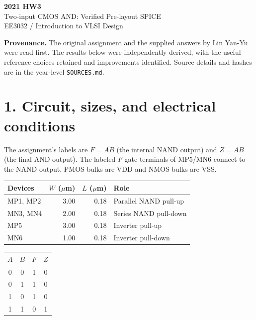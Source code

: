 \documentclass[11pt,a4paper]{article}
\newcommand{\VDD}{V_{\mathrm{DD}}}
\newcommand{\VSS}{V_{\mathrm{SS}}}
\newcommand{\MOS}[5]{
  \coordinate (#1) at (#2,#3);
  \coordinate (#1t) at ($(#1)+(0,.55)$);
  \coordinate (#1b) at ($(#1)+(0,-.55)$);
  \draw (#1t)--($(#1)+(0,.30)$)--($(#1)+(-.18,.30)$);
  \draw ($(#1)+(-.18,.34)$)--($(#1)+(-.18,-.34)$);
  \draw ($(#1)+(-.18,-.30)$)--($(#1)+(0,-.30)$)--(#1b);
  \draw ($(#1)+(-.35,.33)$)--($(#1)+(-.35,-.33)$);
  \def\type{#5}\def\ptype{p}
  \ifx\type\ptype
    \draw ($(#1)+(-.78,0)$)--($(#1)+(-.53,0)$);
    \draw ($(#1)+(-.465,0)$) circle (.065);
    \draw ($(#1)+(-.40,0)$)--($(#1)+(-.35,0)$);
  \else
    \draw ($(#1)+(-.78,0)$)--($(#1)+(-.35,0)$);
  \fi
  \node[anchor=east] at ($(#1)+(-.82,0)$) {$#4$};
  \node[anchor=west,font=\scriptsize] at ($(#1)+(.10,0)$) {#1};
}
\begin{document}
\begin{center}{\LARGE\bfseries 2021 HW3}\\[4pt]{\large Two-input CMOS AND: Verified Pre-layout SPICE}\\[4pt]{\small EE3032 / Introduction to VLSI Design}\end{center}
\textbf{Provenance.} The original assignment and the supplied answers by Lin Yan-Yu were read first. The results below were independently derived, with the useful reference choices retained and improvements identified. Source details and hashes are in the year-level \texttt{SOURCES.md}.

\section*{1. Circuit, sizes, and electrical conditions}
The assignment's labels are $F=\overline{AB}$ (the internal NAND output) and $Z=AB$ (the final AND output). The labeled $F$ gate terminals of MP5/MN6 connect to the NAND output. PMOS bulks are VDD and NMOS bulks are VSS.
\begin{center}\end{center}
\begin{center}\begin{tabular}{lrrl}\toprule
Devices&$W$ ($\mu$m)&$L$ ($\mu$m)&Role\\\midrule
MP1, MP2&3.00&0.18&Parallel NAND pull-up\\
MN3, MN4&2.00&0.18&Series NAND pull-down\\
MP5&3.00&0.18&Inverter pull-up\\
MN6&1.00&0.18&Inverter pull-down\\\bottomrule
\end{tabular}\qquad\begin{tabular}{cc|cc}\toprule
$A$&$B$&$F$&$Z$\\\midrule0&0&1&0\\0&1&1&0\\1&0&1&0\\1&1&0&1\\\bottomrule
\end{tabular}\end{center}
\end{document}
